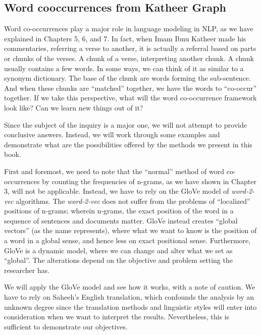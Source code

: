 \documentclass[
]{article}
\begin{document}
\hypertarget{word-cooccurrences-from-Katheer-graph}{%
\subsection{Word cooccurrences from Katheer Graph}\label{word-cooccurrences-from-Katheer-graph}}

Word co-occurrences play a major role in language modeling in NLP, as we have explained in Chapters 5, 6, and 7. In fact, when Imam Ibnu Katheer made his commentaries, referring a verse to another, it is actually a referral based on parts or chunks of the verses. A chunk of a verse, interpreting another chunk. A chunk usually contains a few words. In some ways, we can think of it as similar to a synonym dictionary. The base of the chunk are words forming the sub-sentence. And when these chunks are ``matched'' together, we have the words to ``co-occur'' together. If we take this perspective, what will the word co-occurrence framework look like? Can we learn new things out of it?

Since the subject of the inquiry is a major one, we will not attempt to provide conclusive answers. Instead, we will work through some examples and demonstrate what are the possibilities offered by the methods we present in this book.

First and foremost, we need to note that the ``normal'' method of word co-occurrences by counting the frequencies of n-grams, as we have shown in Chapter 3, will not be applicable. Instead, we have to rely on the GloVe model of \emph{word-2-vec} algorithms. The \emph{word-2-vec} does not suffer from the problems of ``localized'' positions of n-grams; wherein n-grams, the exact position of the word in a sequence of sentences and documents matter. GloVe instead creates ``global vectors'' (as the name represents), where what we want to know is the position of a word in a global sense, and hence less on exact positional sense. Furthermore, GloVe is a dynamic model, where we can change and alter what we set as ``global''. The alterations depend on the objective and problem setting the researcher has.

We will apply the GloVe model and see how it works, with a note of caution. We have to rely on Saheeh's English translation, which confounds the analysis by an unknown degree since the translation methods and linguistic styles will enter into consideration when we want to interpret the results. Nevertheless, this is sufficient to demonstrate our objectives.
\end{document}
